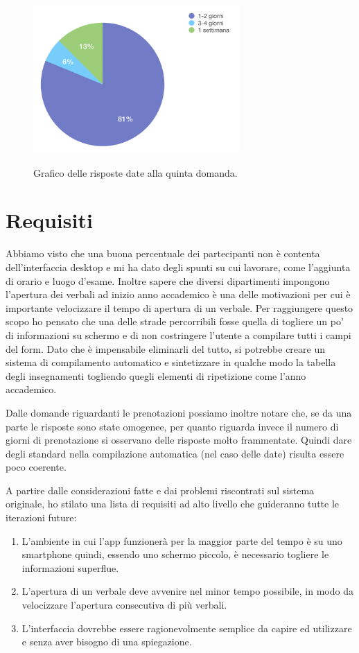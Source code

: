 \documentclass[Lau, oneside, noexaminfo]{sapthesis}%
\begin{document}
\begin{figure}[H]
	\caption{Grafico delle risposte date alla quinta domanda.}
	\centering
	\includegraphics[width=0.7\textwidth]{d-v}
	\label{fig:d-v}
\end{figure}

\section{Requisiti}
\label{sec:req}
Abbiamo visto che una buona percentuale dei partecipanti non è contenta dell'interfaccia desktop e mi ha dato degli spunti su cui lavorare, come l'aggiunta di orario e luogo d'esame. Inoltre sapere che diversi dipartimenti impongono l'apertura dei verbali ad inizio anno accademico è una delle motivazioni per cui è importante velocizzare il tempo di apertura di un verbale. Per raggiungere questo scopo ho pensato che una delle strade percorribili fosse quella di togliere un po' di informazioni su schermo e di non costringere l'utente a compilare tutti i campi del form. Dato che è impensabile eliminarli del tutto, si potrebbe creare un sistema di compilamento automatico e sintetizzare in qualche modo la tabella degli insegnamenti togliendo quegli elementi di ripetizione come l'anno accademico.

Dalle domande riguardanti le prenotazioni possiamo inoltre notare che, se da una parte le risposte sono state omogenee, per quanto riguarda invece il numero di giorni di prenotazione si osservano delle risposte molto frammentate. Quindi dare degli standard nella compilazione automatica (nel caso delle date) risulta essere poco coerente.

A partire dalle considerazioni fatte e dai problemi riscontrati sul sistema originale, ho stilato una lista di requisiti ad alto livello che guideranno tutte le iterazioni future:
\begin{enumerate}
	\item L'ambiente in cui l'app funzionerà per la maggior parte del tempo è su uno smartphone quindi, essendo uno schermo piccolo, è necessario togliere le informazioni superflue.
	\item L'apertura di un verbale deve avvenire nel minor tempo possibile, in modo da velocizzare l'apertura consecutiva di più verbali.
	\item L'interfaccia dovrebbe essere ragionevolmente semplice da capire ed utilizzare e senza aver bisogno di una spiegazione.
\end{enumerate}
\end{document}
